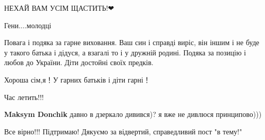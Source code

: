 \begin{itemize}
НЕХАЙ ВАМ УСІМ ЩАСТИТЬ!❤

 
Гени....молодці

 

Повага і подяка за гарне виховання. Ваш син і справді виріс, він іншим і не буде
у такого батька і дідуся, а взагалі то і у дружній родині. Подяка за позицію і
любов до України. Діти достойні своїх предків.


 
Хороша сім,я！У гарних батьків і діти гарні！

 
Час летить!!!

\begin{itemize}
 
\textbf{Maksym Donchik} давно в дзеркало дивився)? я вже не дивлюся принципово)))
\end{itemize}

 
Все вірно!!! Підтримаю! Дякуємо за відвертий, справедливий пост "в тему!"


\end{itemize}
